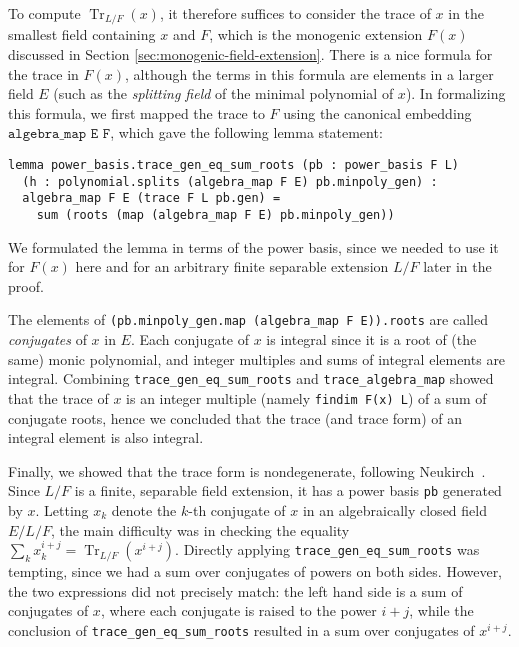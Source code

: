 \documentclass[a4paper,USenglish,cleveref, autoref, thm-restate]{lipics-v2021}
\newcommand{\lean}[1]{\texttt{#1}\xspace} %
\DeclareMathOperator{\Tr}{Tr}
\begin{document}
To compute $\Tr_{L/F}(x)$, it therefore suffices to consider the trace of $x$ in the smallest field containing $x$ and $F$, which is the monogenic extension $F(x)$ discussed in Section \ref{sec:monogenic-field-extension}.
There is a nice formula for the trace in $F(x)$, although the terms in this formula are elements in a larger field $E$
(such as the \emph{splitting field} of the minimal polynomial of $x$).
In formalizing this formula, we first mapped the trace to $F$ using the canonical embedding $\lean{algebra\_map E F}$,
which gave the following lemma statement:
\begin{lstlisting}
lemma power_basis.trace_gen_eq_sum_roots (pb : power_basis F L)
  (h : polynomial.splits (algebra_map F E) pb.minpoly_gen) :
  algebra_map F E (trace F L pb.gen) =
    sum (roots (map (algebra_map F E) pb.minpoly_gen))
\end{lstlisting}
We formulated the lemma in terms of the power basis, since we needed to use it for $F(x)$ here
and for an arbitrary finite separable extension $L / F$ later in the proof.

The elements of \lean{(pb.minpoly\_gen.map (algebra\_map F E)).roots} are called \emph{conjugates} of $x$ in $E$.
Each conjugate of $x$ is integral since it is a root of (the same) monic polynomial,
and integer multiples and sums of integral elements are integral.
Combining \lean{trace\_gen\_eq\_sum\_roots} and \lean{trace\_algebra\_map} showed that the trace of $x$ is an integer multiple (namely \lean{findim F(x) L}) of a sum of conjugate roots, hence we concluded that the trace (and trace form) of an integral element is also integral.

Finally, we showed that the trace form is nondegenerate, following Neukirch~\cite[Proposition~2.8]{Neukirch}.
Since $L / F$ is a finite, separable field extension, it has a power basis \lean{pb} generated by $x$.
Letting $x_k$ denote the $k$-th conjugate of $x$ in an algebraically closed field $E / L / F$,
the main difficulty was in checking the equality $\sum_k x_k^{i + j} = \Tr_{L / F} (x^{i + j})$.
Directly applying \lean{trace\_gen\_eq\_sum\_roots} was tempting, since we had a sum over conjugates of powers on both sides.
However, the two expressions did not precisely match: the left hand side is a sum of conjugates of $x$, where each conjugate is raised to the power $i + j$,
while the conclusion of \lean{trace\_gen\_eq\_sum\_roots} resulted in a sum over conjugates of $x^{i + j}$.
\end{document}

